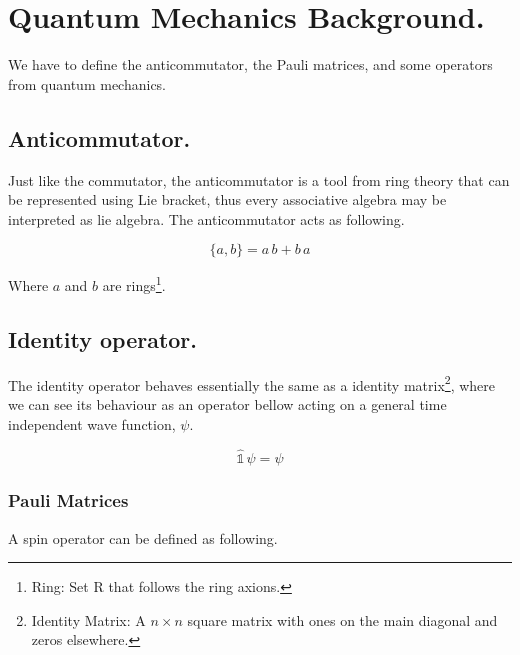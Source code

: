 \documentclass[a4page,12pt]{article}
\newcommand{\eqL}[2]{
	\begin{equation} \label{#1}
		#2
	\end{equation}
}
\begin{document}
	\section{Quantum Mechanics Background.}

		We have to define the anticommutator, the Pauli matrices, and some operators from quantum mechanics.

		\subsection{Anticommutator.}

			Just like the commutator, the anticommutator is a tool from ring theory that can be represented using Lie bracket, thus every associative algebra may be interpreted as lie algebra. The anticommutator acts as following.

		\eqL{anticommutatorDef}{
			\{a,b\} = a\,b + b\,a
		}

			Where $a$ and $b$ are rings\footnote{Ring: Set R that follows the ring axions.}.

		\subsection{Identity operator.}

			The identity operator behaves essentially the same as a identity matrix\footnote{Identity Matrix: A $n\times n$ square matrix with ones on the main diagonal and zeros elsewhere.}, where we can see its behaviour as an operator bellow acting on a general time independent wave function, $\psi$.

		\[
			\hat{\mathbb{1}} \,\psi = \psi
		\]

		\subsubsection{Pauli Matrices}

			A spin operator can be defined as following.
\end{document}

